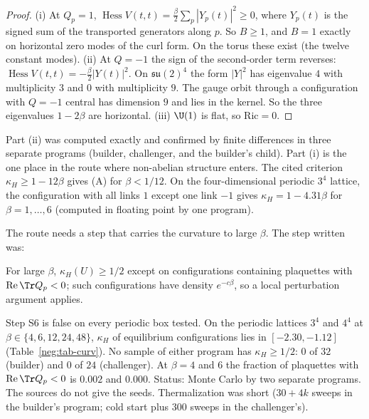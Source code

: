 \begin{proof}
(i) At $Q_p=1$, $\operatorname{Hess}V(t,t)=\frac{\beta}{2}\sum_p|Y_p(t)|^2\ge0$, where $Y_p(t)$
is the signed sum of the transported generators along $p$. So $B\ge1$, and $B=1$ exactly on
horizontal zero modes of the curl form. On the torus these exist (the twelve constant modes).
(ii) At $Q=-1$ the sign of the second-order term reverses:
$\operatorname{Hess}V(t,t)=-\frac{\beta}{2}|Y(t)|^2$. On $\mathfrak{su}(2)^4$ the form $|Y|^2$ has
eigenvalue $4$ with multiplicity $3$ and $0$ with multiplicity $9$. The gauge orbit through a
configuration with $Q=-1$ central has dimension $9$ and lies in the kernel. So the three
eigenvalues $1-2\beta$ are horizontal.
(iii) $\U(1)$ is flat, so $\mathrm{Ric}=0$.
\end{proof}

Part (ii) was computed exactly and confirmed by finite differences in three separate programs
(builder, challenger, and the builder's child). Part (i) is the one place in the route where
non-abelian structure enters. The cited criterion $\kappa_H\ge1-12\beta$ \cite[(4.2), (4.8),
Thm.~1.4]{SZZ23} gives (A) for $\beta<1/12$. On the four-dimensional periodic $3^4$ lattice,
the configuration with all links $1$ except one link $-1$ gives $\kappa_H=1-4.31\beta$ for
$\beta=1,\dots,6$ (computed in floating point by one program).

The route needs a step that carries the curvature to large $\beta$. The step written was:

\begin{hypothesis}[Step S6]\label{neg:hyp-S6}
For large $\beta$, $\kappa_H(U)\ge 1/2$ except on configurations containing plaquettes with
$\operatorname{Re}\Tr Q_p<0$; such configurations have density $e^{-c\beta}$, so a local
perturbation argument applies.
\end{hypothesis}

\begin{observation}\label{neg:obs-curv}
Step S6 is false on every periodic box tested. On the periodic lattices $3^4$ and $4^4$ at
$\beta\in\{4,6,12,24,48\}$, $\kappa_H$ of equilibrium configurations lies in
$[-2.30,-1.12]$ (Table~\ref{neg:tab-curv}). No sample of either program has $\kappa_H\ge1/2$:
$0$ of $32$ (builder) and $0$ of $24$ (challenger). At $\beta=4$ and $6$ the fraction of
plaquettes with $\operatorname{Re}\Tr Q_p<0$ is $0.002$ and $0.000$. Status: Monte Carlo by two
separate programs. The sources do not give the seeds. Thermalization was short ($30+4k$
sweeps in the builder's program; cold start plus $300$ sweeps in the challenger's).
\end{observation}

